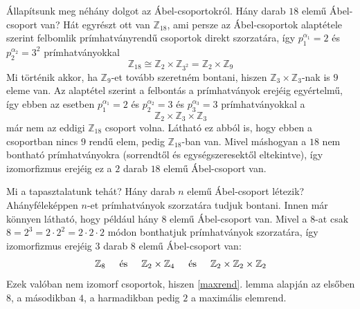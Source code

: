 \documentclass[12pt]{book}
\theoremstyle{plain} %
\theoremstyle{definition} %
\theoremstyle{remark}
\numberwithin{equation}{section}  %
\def\Z{\mathbb{Z}}
\begin{document}
	Állapítsunk meg néhány dolgot az Ábel-csoportokról. Hány darab $18$ elemű Ábel-csoport van? Hát egyrészt ott van $\Z_{18}$, ami persze az Ábel-csoportok alaptétele szerint felbomlik prímhatványrendű csoportok direkt szorzatára, így $p_1^{\alpha_1} = 2$ és $p_2^{\alpha_2} = 3^2$ prímhatványokkal
	\[ \Z_{18} \cong \Z_2 \times \Z_{3^2} = \Z_2 \times \Z_9  \]
	Mi történik akkor, ha $\Z_9$-et tovább szeretném bontani, hiszen $\Z_3\times \Z_3$-nak is $9$ eleme van. Az alaptétel szerint a felbontás a prímhatványok erejéig egyértelmű, így ebben az esetben $p_1^{\alpha_1} = 2$ és $p_2^{\alpha_2} = 3$ és $p_3^{\alpha_3} = 3$ prímhatványokkal a
	\[ \Z_2 \times \Z_3 \times \Z_3  \]
	már nem az eddigi $\Z_{18}$ csoport volna. Látható ez abból is, hogy ebben a csoportban nincs $9$ rendű elem, pedig $\Z_{18}$-ban van. Mivel máshogyan a $18$ nem bontható prímhatványokra (sorrendtől és egységszeresektől eltekintve), így izomorfizmus erejéig ez a $2$ darab $18$ elemű Ábel-csoport van.
	
	Mi a tapasztalatunk tehát? Hány darab $n$ elemű Ábel-csoport létezik? Ahányféleképpen $n$-et prímhatványok szorzatára tudjuk bontani. Innen már könnyen látható, hogy például hány $8$ elemű Ábel-csoport van. Mivel a $8$-at csak $8=2^3=2\cdot 2^2 = 2 \cdot 2 \cdot 2$ módon bonthatjuk prímhatványok szorzatára, így izomorfizmus erejéig $3$ darab $8$ elemű Ábel-csoport van:
	\[ \Z_8 \hspace{5mm} \text{és} \hspace{5mm} \Z_2\times \Z_4 \hspace{5mm} \text{és} \hspace{5mm} \Z_2\times \Z_2 \times \Z_2   \]
	Ezek valóban nem izomorf csoportok, hiszen \ref{maxrend}. lemma alapján az elsőben $8$, a másodikban $4$, a harmadikban pedig $2$ a maximális elemrend.
	
\end{document}
